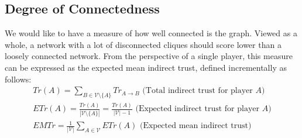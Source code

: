 \subsection{Degree of Connectedness}
  We would like to have a measure of how well connected is the graph. Viewed as a whole, a network with a lot of disconnected
  cliques should score lower than a loosely connected network. From the perspective of a single player, this measure can be
  expressed as the expected mean indirect trust, defined incrementally as follows:
  \begin{gather*}
    Tr(A) = \sum\limits_{B \in \mathcal{V} \setminus \{A\}}Tr_{A \rightarrow B} \mbox{ (Total indirect trust for player
    }A\mbox{)} \\
    ETr\left(A\right) = \frac{Tr(A)}{|\mathcal{V} \setminus \{A\}|} = \frac{Tr(A)}{|\mathcal{V}| - 1} \mbox{ (Expected
    indirect trust for player }A\mbox{)} \\
    EMTr = \frac{1}{|\mathcal{V}|}\sum\limits_{A \in \mathcal{V}}ETr\left(A\right) \mbox{ (Expected mean indirect trust)}
  \end{gather*}
